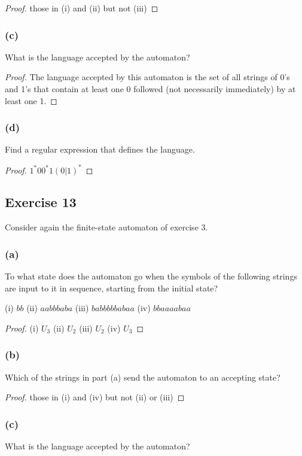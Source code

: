 \documentclass[14pt]{extarticle}
\begin{document}
\begin{proof}
    those in (i) and (ii) but not (iii)
\end{proof}

\subsubsection{(c)}
What is the language accepted by the automaton?
\begin{proof}
    The language accepted by this automaton is the set of all strings of 0’s and 1’s that contain at least one 0 followed
    (not necessarily immediately) by at least one 1.
\end{proof}

\subsubsection{(d)}
Find a regular expression that defines the language.
\begin{proof}
    \(1^*00^*1(0 | 1)^*\)
\end{proof}

\subsection{Exercise 13}
Consider again the finite-state automaton of exercise 3.

\subsubsection{(a)}
To what state does the automaton go when the symbols of the following strings are input to it in sequence, starting from
the initial state?

(i) \(bb\) (ii) \(aabbbaba\) (iii) \(babbbbbabaa\) (iv) \(bbaaaabaa\)

\begin{proof}
    (i) \(U_3\) (ii) \(U_2\) (iii) \(U_2\) (iv) \(U_3\)
\end{proof}

\subsubsection{(b)}
Which of the strings in part (a) send the automaton to an accepting state?

\begin{proof}
    those in (i) and (iv) but not (ii) or (iii)
\end{proof}

\subsubsection{(c)}
What is the language accepted by the automaton?
\end{document}

